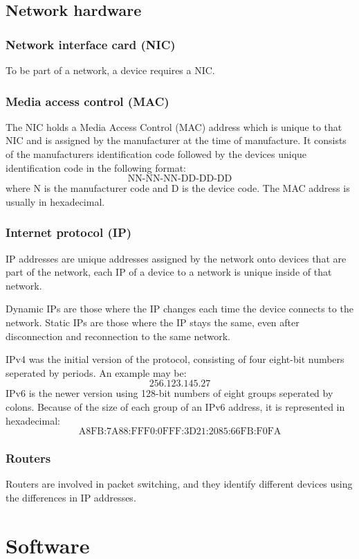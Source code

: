 \documentclass{article}
\begin{document}
\subsection{Network hardware}
\subsubsection{Network interface card (NIC)}
To be part of a network, a device requires a NIC. 

\subsubsection{Media access control (MAC)}
The NIC holds a Media Access Control
(MAC) address which is unique to that NIC and is assigned by the manufacturer at the time
of manufacture. It consists of the manufacturers identification code followed by the
devices unique identification code in the following format:
\[\textrm{NN-NN-NN-DD-DD-DD}\]
where N is the manufacturer code and D is the device code. The MAC address is usually
in hexadecimal.

\subsubsection{Internet protocol (IP)}
IP addresses are unique addresses assigned by the network onto devices that are part of
the network, each IP of a device to a network is unique inside of that network. 

Dynamic IPs are those where the IP changes each time the device connects to the network.
Static IPs are those where the IP stays the same, even after disconnection and 
reconnection to the same network.

IPv4 was the initial version of the protocol, consisting of four eight-bit numbers 
seperated by periods. An example may be:
\[256.123.145.27\]
IPv6 is the newer version using 128-bit numbers of eight groups seperated by colons. 
Because of the size of each group of an IPv6 address, it is represented in hexadecimal:
\[\textrm{A8FB:7A88:FFF0:0FFF:3D21:2085:66FB:F0FA}\]

\subsubsection{Routers}
Routers are involved in packet switching, and they identify different devices using the
differences in IP addresses.

\section{Software}
\end{document}
